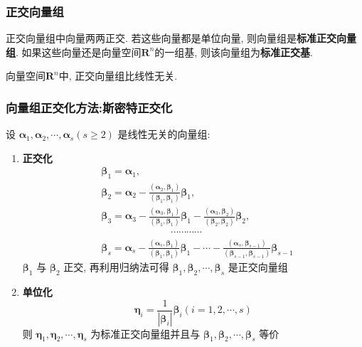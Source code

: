 \documentclass{article}
\begin{document}
			\subsubsection{正交向量组}
				正交向量组中向量两两正交. 若这些向量都是单位向量, 则向量组是\textbf{标准正交向量组}. 如果这些向量还是向量空间$\mathbf{R}^n$的一组基, 则该向量组为\textbf{标准正交基}.

				向量空间$\mathbf{R}^n$中, 正交向量组比线性无关.

				\subsubsection*{向量组正交化方法:斯密特正交化}

					设 $\boldsymbol{\alpha}_{1}, \boldsymbol{\alpha}_{2}, \cdots, \boldsymbol{\alpha}_{s}(s \geqslant 2)$ 是线性无关的向量组:
					\begin{enumerate}
						\item \textbf{正交化}
						$$
						\begin{aligned}
							&\boldsymbol{\beta}_{1}=\boldsymbol{\alpha}_{1}, \\
							&\boldsymbol{\beta}_{2}=\boldsymbol{\alpha}_{2}-\frac{\left(\boldsymbol{\alpha}_{2}, \boldsymbol{\beta}_{1}\right)}{\left(\boldsymbol{\beta}_{1}, \boldsymbol{\beta}_{1}\right)} \boldsymbol{\beta}_{1}, \\
							&\boldsymbol{\beta}_{3}=\boldsymbol{\alpha}_{3}-\frac{\left(\boldsymbol{\alpha}_{3}, \boldsymbol{\beta}_{1}\right)}{\left(\boldsymbol{\beta}_{1}, \boldsymbol{\beta}_{1}\right)} \boldsymbol{\beta}_{1}-\frac{\left(\boldsymbol{\alpha}_{3}, \boldsymbol{\beta}_{2}\right)}{\left(\boldsymbol{\beta}_{2}, \boldsymbol{\beta}_{2}\right)} \boldsymbol{\beta}_{2}, \\
							&\quad \qquad \qquad \qquad \cdots \cdots \cdots \cdots \\
							&\boldsymbol{\beta}_{s}=\boldsymbol{\alpha}_{s}-\frac{\left(\boldsymbol{\alpha}_{s}, \boldsymbol{\beta}_{1}\right)}{\left(\boldsymbol{\beta}_{1}, \boldsymbol{\beta}_{1}\right)} \boldsymbol{\beta}_{1}-\cdots-\frac{\left(\boldsymbol{\alpha}_{s}, \boldsymbol{\beta}_{s-1}\right)}{\left(\boldsymbol{\beta}_{s-1}, \boldsymbol{\beta}_{s-1}\right)} \boldsymbol{\beta}_{s-1}
						\end{aligned}
						$$
						$\boldsymbol{\beta}_{1}$ 与 $\boldsymbol{\beta}_{2}$ 正交, 再利用归纳法可得 $\boldsymbol{\beta}_{1}, \boldsymbol{\beta}_{2}, \cdots, \boldsymbol{\beta}_{s}$ 是正交向量组
						\item \textbf{单位化}
						$$
						\boldsymbol{\eta}_{i}=\frac{1}{\left|\boldsymbol{\beta}_{i}\right|} \boldsymbol{\beta}_{i}(i=1,2, \cdots, s)
						$$
						则 $\boldsymbol{\eta}_{1}, \boldsymbol{\eta}_{2}, \cdots, \boldsymbol{\eta}_{s}$ 为标准正交向量组并且与 $\boldsymbol{\beta}_{1}, \boldsymbol{\beta}_{2}, \cdots, \boldsymbol{\beta}_{s}$ 等价
					\end{enumerate}
\end{document}
